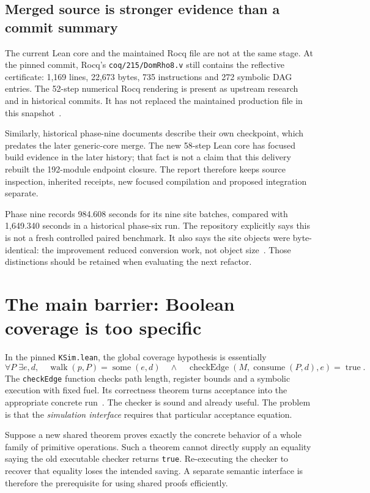 \documentclass[11pt]{article}
\newcommand{\code}[1]{\texttt{\small #1}}
\begin{document}
\subsection{Merged source is stronger evidence than a commit summary}

The current Lean core and the maintained Rocq file are not at the same stage. At the pinned commit, Rocq's \code{coq/215/DomRho8.v} still contains the reflective certificate: 1,169 lines, 22,673 bytes, 735 instructions and 272 symbolic DAG entries. The 52-step numerical Rocq rendering is present as upstream research and in historical commits. It has not replaced the maintained production file in this snapshot~\cite{cdstatus}.

Similarly, historical phase-nine documents describe their own checkpoint, which predates the later generic-core merge. The new 58-step Lean core has focused build evidence in the later history; that fact is not a claim that this delivery rebuilt the 192-module endpoint closure. The report therefore keeps source inspection, inherited receipts, new focused compilation and proposed integration separate.

Phase nine records 984.608 seconds for its nine site batches, compared with 1,649.340 seconds in a historical phase-six run. The repository explicitly says this is not a fresh controlled paired benchmark. It also says the site objects were byte-identical: the improvement reduced conversion work, not object size~\cite{phase9}. Those distinctions should be retained when evaluating the next refactor.

\section{The main barrier: Boolean coverage is too specific}
\label{sec:coverage}

In the pinned \code{KSim.lean}, the global coverage hypothesis is essentially
\[
 \forall P\;\exists e,d,\quad
 \operatorname{walk}(p,P)=\operatorname{some}(e,d)
 \quad\land\quad
 \operatorname{checkEdge}(M,\operatorname{consume}(P,d),e)=\operatorname{true}.
\]
The \code{checkEdge} function checks path length, register bounds and a symbolic execution with fixed fuel. Its correctness theorem turns acceptance into the appropriate concrete run~\cite{ksim}. The checker is sound and already useful. The problem is that the \emph{simulation interface} requires that particular acceptance equation.

Suppose a new shared theorem proves exactly the concrete behavior of a whole family of primitive operations. Such a theorem cannot directly supply an equality saying the old executable checker returns \code{true}. Re-executing the checker to recover that equality loses the intended saving. A separate semantic interface is therefore the prerequisite for using shared proofs efficiently.
\end{document}
